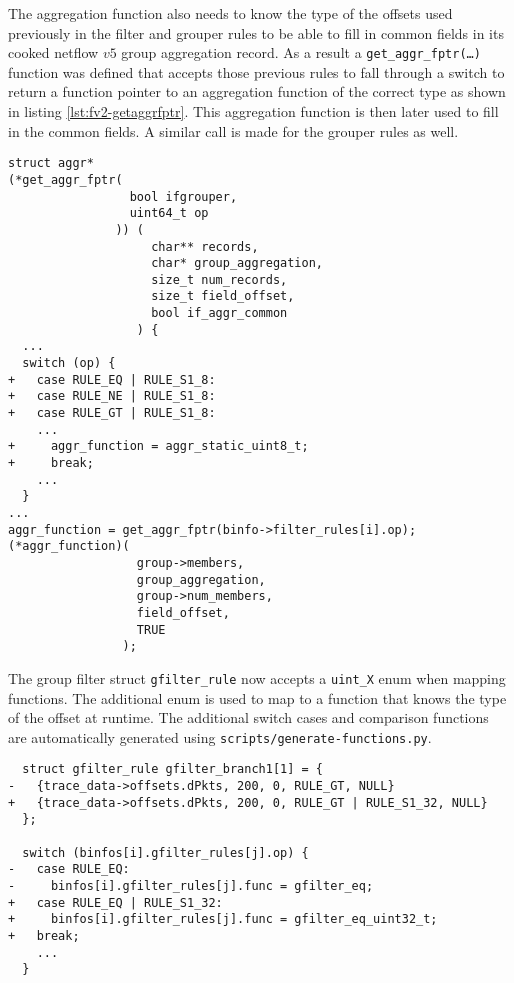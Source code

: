 The aggregation function also needs to know the type of the offsets used
previously in the filter and grouper rules to be able to fill in common fields
in its cooked netflow $v5$ group aggregation record. As a result
 a
\texttt{get\_aggr\_fptr(\ldots)} function was defined that accepts those
previous rules to fall through a switch to return a function pointer to an
aggregation function of the correct type as shown in listing
\ref{lst:fv2-getaggrfptr}. This aggregation function is then later used to
fill in the common fields. A similar call is made for the grouper rules as
well.

\begin{lstlisting}
struct aggr*
(*get_aggr_fptr(
                 bool ifgrouper,
                 uint64_t op
               )) (
                    char** records,
                    char* group_aggregation,
                    size_t num_records,
                    size_t field_offset,
                    bool if_aggr_common
                  ) {
  ...
  switch (op) {
+   case RULE_EQ | RULE_S1_8:
+   case RULE_NE | RULE_S1_8:
+   case RULE_GT | RULE_S1_8:
    ...
+     aggr_function = aggr_static_uint8_t;
+     break;
    ...
  }
...
aggr_function = get_aggr_fptr(binfo->filter_rules[i].op);
(*aggr_function)(
                  group->members,
                  group_aggregation,
                  group->num_members,
                  field_offset,
                  TRUE
                );
\end{lstlisting}


The group filter struct \texttt{gfilter\_rule} now accepts a \texttt{uint\_X}
enum when mapping functions. The additional enum is used to map to a function
that  knows the type of the offset at
runtime. The additional switch cases and comparison functions are
automatically generated using \texttt{scripts/generate-functions.py}.

\begin{lstlisting}
  struct gfilter_rule gfilter_branch1[1] = {
-   {trace_data->offsets.dPkts, 200, 0, RULE_GT, NULL}
+   {trace_data->offsets.dPkts, 200, 0, RULE_GT | RULE_S1_32, NULL}
  };

  switch (binfos[i].gfilter_rules[j].op) {
-   case RULE_EQ:
-     binfos[i].gfilter_rules[j].func = gfilter_eq;
+   case RULE_EQ | RULE_S1_32:
+     binfos[i].gfilter_rules[j].func = gfilter_eq_uint32_t;
+   break;
    ...
  }
\end{lstlisting}





